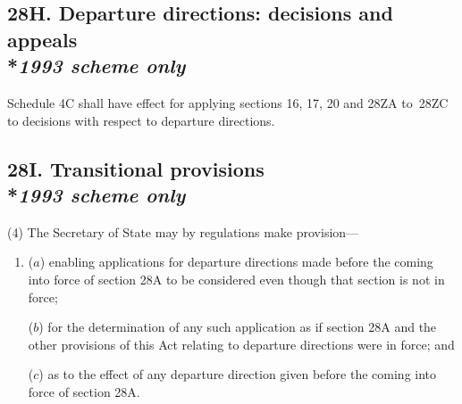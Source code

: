 \documentclass[12pt,a4paper]{article}
\begin{document}
\subsection[28H. Departure directions: decisions and appeals --- \emph{1993 scheme only}]{28H. Departure directions: decisions and appeals\\*\emph{1993 scheme only}}

Schedule 4C shall have effect for applying sections 16, 17, 20 and 28ZA to~28ZC to decisions with respect to departure directions.


\subsection[28I. Transitional provisions --- \emph{1993 scheme only}]{28I. Transitional provisions\\*\emph{1993 scheme only}}

%
%
%

(4) The Secretary of State may by regulations make provision—
\begin{enumerate}\item[]
($a$) enabling applications for departure directions made before the coming into force of section 28A to be considered even though that section is not in force;

($b$) for the determination of any such application as if section 28A and the other provisions of this Act relating to departure directions were in force; and

($c$) as to the effect of any departure direction given before the coming into force of section 28A.
\end{enumerate}
\end{document}

